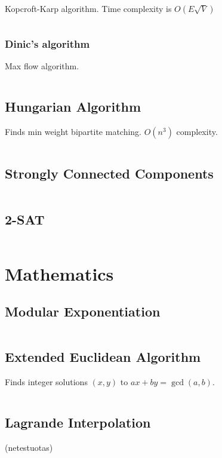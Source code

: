 \documentclass[8pt,a4paper,landscape,oneside]{amsart}
\newcommand{\code}[1]{\inputminted[fontsize=\normalsize,baselinestretch=1]{cpp}{_code/#1}}
\begin{document}
\begin{multicols*}{3}
	Kopcroft-Karp algorithm. Time complexity is $O(E\sqrt{V})$
	
	\code{graphs/bipartite_matching.cpp}
	
	\subsubsection{Dinic's algorithm}
	
	Max flow algorithm.
	
	\code{graphs/dinic.cpp}
	
	\subsection{Hungarian Algorithm}
	
	Finds min weight bipartite matching. $O(n^3)$ complexity.
	
	\code{graphs/hungarian_algorithm.cpp}
	
	\subsection{Strongly Connected Components}
	
	\code{graphs/strongly_connected_components.cpp}
	
	\subsection{2-SAT}
	
	\code{graphs/2sat.cpp}

\section{Mathematics}

	\subsection{Modular Exponentiation}
	
	\code{math/modular_exponentiation.cpp}

	\subsection{Extended Euclidean Algorithm}
	
	Finds integer solutions $(x, y)$ to $ax + by = \gcd(a, b)$.
	
	\code{math/extended_euclidean_algorithm.cpp}
	
	\subsection{Lagrande Interpolation} (netestuotas)
	

\end{multicols*}
\end{document}
